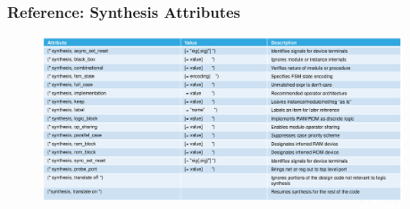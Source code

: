 \documentclass[t, notes, xcolor=table]{beamer}
\begin{document}
\begin{frame}
\frametitle{Reference: Synthesis Attributes}
\begin{figure}
    \includegraphics[width=0.95\textwidth]{img/13_reference_attributes.png}
\end{figure}
\end{frame}
\end{document}
